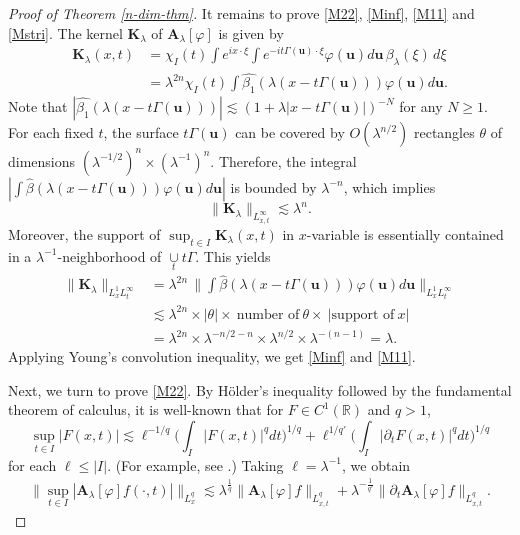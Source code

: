 \documentclass[10pt] %
{amsart}
\theoremstyle{plain}
\numberwithin{equation}{section}
\begin{document}
\begin{proof}[Proof of Theorem \ref{n-dim-thm}]
It remains to prove \eqref{M22}, \eqref{Minf}, \eqref{M11} and \eqref{Mstri}.
The kernel $\mathbf K_\lambda$ of $\mathbf A_\lambda[\varphi] $ is given by
\begin{align*}
\mathbf K_\lambda(x,t) & =\chi_I(t) \int e^{i  x\cdot \xi} \int e^{ -i  t \Gamma(\mathbf u) \cdot \xi}\varphi(\mathbf u)d\mathbf u \, \beta_\lambda(\xi)\,d\xi \\ 
& = \lambda^{2n}\chi_I(t)\int \widehat{\beta_1} (\lambda(x - t \Gamma(\mathbf u))) \varphi(\mathbf u) d\mathbf u.
\end{align*} 
Note that $|\widehat{\beta_1}(\lambda(x - t\Gamma(\mathbf u )))|\lesssim (1+\lambda|x - t\Gamma(\mathbf u )|)^{-N}$ for any $N\ge 1$.  
For each fixed $t$, the surface $t\Gamma(\mathbf u)$ can be covered by $O(\lambda^{n/2})$ rectangles  $\theta$
of dimensions $(\lambda^{-1/2})^n\times (\lambda^{-1})^n$. Therefore, the integral  $|\int \widehat{\beta} (\lambda(x - t \Gamma(\mathbf u))) \varphi(\mathbf u) d\mathbf u|$ is bounded by $\lambda^{-n}$, which implies
\[\| \mathbf K_\lambda\|_{L^\infty_{x,t}} \lesssim \lambda^n.\] 
Moreover, the support of $\sup_{t\in I} \mathbf K_\lambda(x,t)$ in $x$-variable is essentially contained in a $\lambda^{-1}$-neighborhood of $\mathop{\cup}\limits_{t} t\Gamma$. This yields
\begin{align*}
\| \mathbf K_\lambda \|_{L^1_xL^\infty_t }
& = \lambda^{2n} \,\Big\| \int \widehat{\beta} (\lambda(x - t \Gamma(\mathbf u))) \varphi(\mathbf u) d\mathbf u \Big\|_{L^1_xL^\infty_t } \\
&\lesssim \lambda^{2n} \times |\theta| \times~ \text{number of}~\theta \times ~|\text{support of}~  x |~ \\
&= \lambda^{2n} \times  \lambda^{-n/2 - n}  \times \lambda^{n/2}\times \lambda^{-(n-1)} = \lambda. 
\end{align*}  
Applying Young's convolution inequality, we get \eqref{Minf} and \eqref{M11}.
 
 

Next, we turn to prove \eqref{M22}.
By H\"older's inequality followed by the fundamental theorem of calculus, it is well-known  that for $F \in C^1(\mathbb R)$ and $q>1$, 
\begin{equation}\label{emb}
  \sup_{t\in I } |F(x,t)|   \lesssim  \ell^{-1/q} \big(\int_I |F(x,t)|^q dt \big)^{1/q}   + \ell^{1/q'} \big(\int_I | \partial_t F(x,t) |^q dt \big)^{1/q} 
\end{equation}
 for each $\ell\le |I|$.  (For example, see \cite[Lemma 1(p.499)]{Stein}.)
Taking $\ell=\lambda^{-1}$, we obtain
\begin{align}\label{emb2}
\| \sup_{t\in I} |\mathbf A_\lambda[\varphi]f(\cdot,t)| \|_{L^q_x}    \lesssim \lambda^{\frac1q}\|\mathbf A_\lambda[\varphi]f \|_{L^q_{x,t}}   + 
\lambda^{-\frac1{q'}}\|\partial_t \mathbf A_\lambda[\varphi]f \|_{L^q_{x,t}}.
\end{align}


\end{proof}
\end{document}
